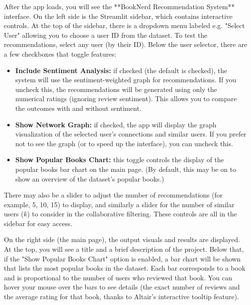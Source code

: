 \documentclass[11pt]{article}
\begin{document}
After the app loads, you will see the **BookNerd Recommendation System** interface. On the left side is the Streamlit sidebar, which contains interactive controls. At the top of the sidebar, there is a dropdown menu labeled e.g. "Select User" allowing you to choose a user ID from the dataset. To test the recommendations, select any user (by their ID). Below the user selector, there are a few checkboxes that toggle features:
\begin{itemize}
  \item \textbf{Include Sentiment Analysis:} if checked (the default is checked), the system will use the sentiment-weighted graph for recommendations. If you uncheck this, the recommendations will be generated using only the numerical ratings (ignoring review sentiment). This allows you to compare the outcomes with and without sentiment.
  \item \textbf{Show Network Graph:} if checked, the app will display the graph visualization of the selected user’s connections and similar users. If you prefer not to see the graph (or to speed up the interface), you can uncheck this.
  \item \textbf{Show Popular Books Chart:} this toggle controls the display of the popular books bar chart on the main page. (By default, this may be on to show an overview of the dataset’s popular books.)
\end{itemize}
There may also be a slider to adjust the number of recommendations (for example, 5, 10, 15) to display, and similarly a slider for the number of similar users ($k$) to consider in the collaborative filtering. These controls are all in the sidebar for easy access.

On the right side (the main page), the output visuals and results are displayed. At the top, you will see a title and a brief description of the project. Below that, if the "Show Popular Books Chart" option is enabled, a bar chart will be shown that lists the most popular books in the dataset. Each bar corresponds to a book and is proportional to the number of users who reviewed that book. You can hover your mouse over the bars to see details (the exact number of reviews and the average rating for that book, thanks to Altair’s interactive tooltip feature).
\end{document}
